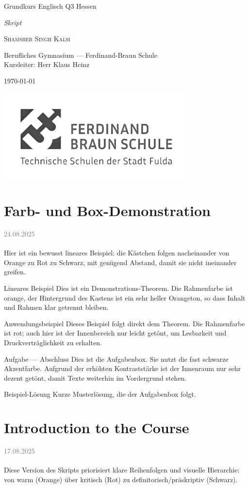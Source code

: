 \documentclass[11pt,a4paper,oneside]{article}
\newcommand{\lessondate}[1]{
	\noindent\hfill\textcolor{gray}{\textsc{#1}} \\
	\vspace{0.5cm}
}
\newcommand{\MakeArtTitle}[4]{%
	\begin{titlepage}
		\vspace*{18mm}
		\begin{center}
			\vspace{12mm}
			{\huge\color{AccentOrange!90!black} #1 \par}
			\vspace{6mm}
			{\Large\itshape\color{AccentRed!70!black} #2 \par}
			\vspace{10mm}
			{\Large\scshape\color{AccentDark} #3 \par}
			\vspace{6mm}
			{\small\color{MarginalGray} #4 \par}
			\vspace{5mm}
			{\small\color{MarginalGray} \today \par}
		\end{center}
		\vspace{7.5cm}
		\centering
		\includegraphics[width=0.75\textwidth]{image.png} %
	\end{titlepage}
}
\begin{document}
	

	
		
	\MakeArtTitle{
		Grundkurs Englisch Q3 Hessen}
	{Skript}
	{Shamsher Singh Kalsi}
	{Berufliches Gymnasium — Ferdinand-Braun Schule \\ Kursleiter: Herr Klaus Heinz}
	
	\tableofcontents
	\bigskip
	\clearpage
	
	
	\section{Farb- und Box-Demonstration}

	
	\lessondate{24.08.2025}\\
	Hier ist ein bewusst lineares Beispiel: die Kästchen folgen nacheinander von Orange zu Rot zu Schwarz, mit genügend Abstand, damit sie nicht ineinander greifen.
	
	\begin{theorem}{Lineares Beispiel}
		Dies ist ein Demonstrations-Theorem. Die Rahmenfarbe ist orange, der Hintergrund des Kastens ist ein sehr heller Orangeton, so dass Inhalt und Rahmen klar getrennt bleiben.
	\end{theorem}
	
	\begin{example}{Anwendungsbeispiel}
		Dieses Beispiel folgt direkt dem Theorem. Die Rahmenfarbe ist rot; auch hier ist der Innenbereich nur leicht getönt, um Lesbarkeit und Druckverträglichkeit zu erhalten.
	\end{example}
	
	\begin{task}{Aufgabe — Abschluss}
		Dies ist die Aufgabenbox. Sie nutzt die fast schwarze Akzentfarbe. Aufgrund der erhöhten Kontraststärke ist der Innenraum nur sehr dezent getönt, damit Texte weiterhin im Vordergrund stehen.
	\end{task}
	
	\begin{solution}{Beispiel-Lösung}
		Kurze Musterlösung, die der Aufgabenbox folgt.
	\end{solution}
	
	\clearpage
	\section{Introduction to the Course}
	\lessondate{17.08.2025}\\
	Diese Version des Skripts priorisiert klare Reihenfolgen und visuelle Hierarchie: von warm (Orange) über kritisch (Rot) zu definitorisch/präskriptiv (Schwarz).
	
	
\end{document}
